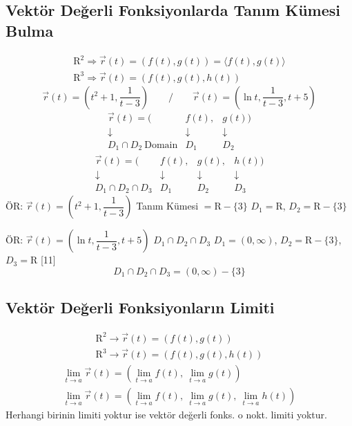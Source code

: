 \documentclass[11pt,a4paper]{article}
\begin{document}
\subsection{Vektör Değerli Fonksiyonlarda Tanım Kümesi Bulma}
\begin{gather*}
\mathrm{R}^2\Rightarrow\vec r(t)=(f(t),g(t))=\langle f(t),g(t)\rangle\\
\mathrm{R}^3\Rightarrow\vec r(t)=(f(t),g(t),h(t))
\end{gather*}
\[ \vec r(t)=\left(t^2+1,\frac{1}{t-3}\right)\qquad /\qquad \vec r(t)=\left(\ln t,\frac{1}{t-3},t+5\right) \]
\[ \begin{array}{ccc}\vec r(t)=(&f(t),&g(t))\\ \downarrow&\downarrow&\downarrow\\ D_1\cap D_2\ \text{Domain}&D_1&D_2\end{array} \]
\[ \begin{array}{cccc}\vec r(t)=(&f(t),&g(t),&h(t))\\ \downarrow&\downarrow&\downarrow&\downarrow\\ D_1\cap D_2\cap D_3&D_1&D_2&D_3\end{array} \]
ÖR: $\vec r(t)=\left(t^2+1,\dfrac{1}{t-3}\right)$ \quad Tanım Kümesi $=\mathrm{R}-\{3\}$ \quad $D_1=\mathrm{R}$, $D_2=\mathrm{R}-\{3\}$

ÖR: $\vec r(t)=\left(\ln t,\dfrac{1}{t-3},t+5\right)$ \quad $D_1\cap D_2\cap D_3$ \quad $D_1=(0,\infty)$, $D_2=\mathrm{R}-\{3\}$, $D_3=\mathrm{R}$
[11]
\[ D_1\cap D_2\cap D_3=(0,\infty)-\{3\} \]

\subsection{Vektör Değerli Fonksiyonların Limiti}
\begin{gather*}
\mathrm{R}^2\to\vec r(t)=(f(t),g(t))\\
\mathrm{R}^3\to\vec r(t)=(f(t),g(t),h(t))
\end{gather*}
\begin{gather*}
\lim_{t\to a}\vec r(t)=\left(\lim_{t\to a}f(t),\ \lim_{t\to a}g(t)\right)\\
\lim_{t\to a}\vec r(t)=\left(\lim_{t\to a}f(t),\ \lim_{t\to a}g(t),\ \lim_{t\to a}h(t)\right)
\end{gather*}
Herhangi birinin limiti yoktur ise vektör değerli fonks. o nokt. limiti yoktur.
\end{document}
